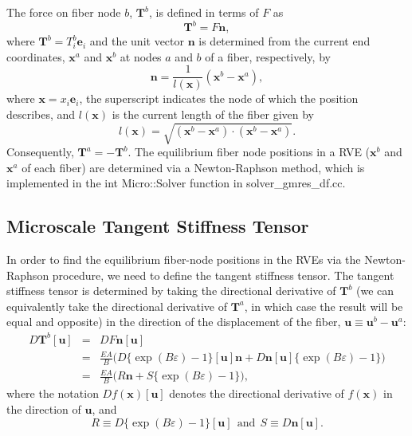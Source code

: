 The force on fiber node $b$, $\textbf{T}^b$, is defined in terms of $F$ as
%
\begin{equation}
\textbf{T}^b = F \textbf{n},
\label{fiber_node_force}
\end{equation}
%
where $\textbf{T}^b = T^b_i \textbf{e}_i$ and the unit vector $\textbf{n}$ is determined from the current end coordinates, $\textbf{x}^a$ and $\textbf{x}^b$ at nodes $a$ and $b$ of a fiber, respectively, by
%
\begin{equation}
\textbf{n} = \frac{1}{l(\textbf{x})}(\textbf{x}^b - \textbf{x}^a),
\end{equation}
%
where $\textbf{x} = x_i \textbf{e}_i$, the superscript indicates the node of which the position describes, and $l(\textbf{x})$ is the current length of the fiber given by
%
\begin{equation}
l(\textbf{x}) = \sqrt{(\textbf{x}^b - \textbf{x}^a) \cdot (\textbf{x}^b - \textbf{x}^a)}.
\label{fiber_length}
\end{equation}
%
  Consequently, $\textbf{T}^a = - \textbf{T}^b$. The equilibrium fiber node positions in a RVE ($\textbf{x}^b$ and $\textbf{x}^a$ of each fiber) are determined via a Newton-Raphson method, which is implemented in the int Micro::Solver function in solver\_gmres\_df.cc. 

\subsection{Microscale Tangent Stiffness Tensor}
\label{subsec:tangent_stiffness_tensor}

In order to find the equilibrium fiber-node positions in the RVEs via the Newton-Raphson procedure, we need to define the tangent stiffness tensor. The tangent stiffness tensor is determined by taking the directional derivative of $\textbf{T}^b$ (we can equivalently take the directional derivative of $\textbf{T}^a$, in which case the result will be equal and opposite) in the direction of the displacement of the fiber, $\textbf{u} \equiv \textbf{u}^b - \textbf{u}^a$:
%
\begin{eqnarray}
D\textbf{T}^b [\textbf{u}] &=& D F \textbf{n} [\textbf{u}] \nonumber\\
&=& \frac{E A}{B} \bigg(D \{ \exp(B \varepsilon) - 1\} [\textbf{u}] \textbf{n}+ D \textbf{n} [\textbf{u}] \{ \exp(B \varepsilon) - 1\} \bigg) \nonumber\\
&=& \frac{E A}{B} \bigg( R\textbf{n} + S\{\exp(B \varepsilon) - 1\} \bigg),
\label{DT_i}
\end{eqnarray}
%
where the notation $D f(\textbf{x}) [\textbf{u}]$ denotes the directional derivative of $f(\textbf{x})$ in the direction of $\textbf{u}$, and
% 
\begin{equation}
R \equiv D \{ \exp(B \varepsilon) - 1\} [\textbf{u}] \ \ \text{and} \ \
S \equiv D \textbf{n} [\textbf{u}].
\end{equation}
%

